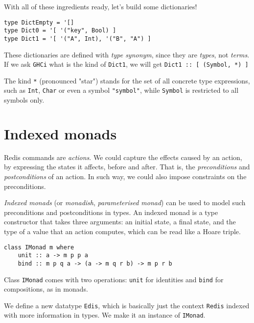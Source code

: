 \documentclass[pldi]{sigplanconf-pldi16}
\begin{document}
With all of these ingredients ready, let's build some dictionaries!

\begin{verbatim}
type DictEmpty = '[]
type Dict0 = '[ '("key", Bool) ]
type Dict1 = '[ '("A", Int), '("B", "A") ]
\end{verbatim}

These dictionaries are defined with \emph{type synonym}, since they are
 \emph{types}, not \emph{terms}. If we ask \texttt{GHCi} what is the
 kind of \texttt{Dict1}, we will get
 \texttt{Dict1 :: [ (Symbol, *) ]}

The kind \texttt{*} (pronounced "star") stands for the set of all
 concrete type expressions, such as \texttt{Int},
 \texttt{Char} or even a symbol \texttt{"symbol"},
 while \texttt{Symbol} is restricted to all symbols only.

\section{Indexed monads}

Redis commands are \emph{actions}.
 We could capture the effects caused by an action, by expressing the states it
 affects, before and after. That is, the \emph{preconditions} and
 \emph{postconditions} of an action. In such way, we could also impose
 constraints on the preconditions.

\emph{Indexed monads} (or \emph{monadish},
 \emph{parameterised monad})\cite{indexedmonad}
 can be used\cite{typefun}\cite{staticresources} to model such preconditions and
 postconditions in types. An indexed monad is a type constructor that takes
 three arguments: an initial state, a final state, and the type of a value that
 an action computes, which can be read like a Hoare triple\cite{kleisli}.

\begin{verbatim}
class IMonad m where
    unit :: a -> m p p a
    bind :: m p q a -> (a -> m q r b) -> m p r b
\end{verbatim}

Class \texttt{IMonad} comes with two operations:
 \texttt{unit} for identities and \texttt{bind} for
 compositions, as in monads.

We define a new datatype \texttt{Edis}, which is basically just
 the context \texttt{Redis} indexed with more information in types.
 We make it an instance of \texttt{IMonad}.
\end{document}
